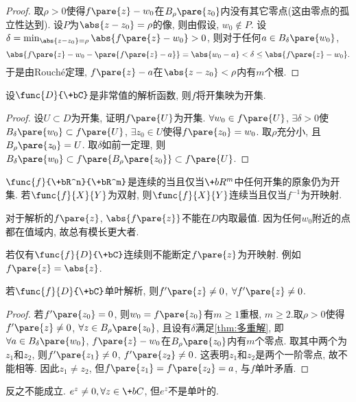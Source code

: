 \documentclass{ctexart}
\begin{document}
\begin{proof}
    取$\rho > 0$使得$f\pare{z} - w_0$在$B_\rho\pare{z_0}$内没有其它零点(这由零点的孤立性达到). 设$P$为$\abs{z-z_0} = \rho$的像, 则由假设, $w_0 \notin P$. 设$\delta = \min_{\abs{z-z_0} = \rho} \abs{f\pare{z} - w_0} > 0$, 则对于任何$a\in B_\delta\pare{w_0}$,
    \[ \abs{f\pare{z} - w_0 - \pare{f\pare{z} - a}} = \abs{w_0 - a} < \delta \le \abs{f\pare{z} - w_0}. \]
    于是由Rouch\'e定理, $f\pare{z} - a$在$\abs{z-z_0}<\rho$内有$m$个根.
\end{proof}
\begin{corollary}[开映射定理]
    设$\func{D}{\+bC}$是非常值的解析函数, 则$f$将开集映为开集.
\end{corollary}
\begin{proof}
    设$U\subset D$为开集, 证明$f\pare{U}$为开集. $\forall w_0 \in f\pare{U}$, $\exists \delta > 0$使$B_\delta\pare{w_0} \subset f\pare{U}$, $\exists z_0 \in U$使得$f\pare{z_0} = w_0$. 取$\rho$充分小, 且$B_\rho\pare{z_0} = U$. 取$\delta$如前一定理, 则$B_\delta\pare{w_0} \subset f\pare{B_\rho\pare{z_0}}\subset f\pare{U}$.
\end{proof}
\begin{remark}
    $\func{f}{\+bR^n}{\+bR^m}$是连续的当且仅当$\+bR^m$中任何开集的原象仍为开集. 若$\func{f}{X}{Y}$为双射, 则$\func{f}{X}{Y}$连续当且仅当$f^{-1}$为开映射.
\end{remark}
\begin{ex}
    对于解析的$f\pare{z}$, $\abs{f\pare{z}}$不能在$D$内取最值. 因为任何$w_0$附近的点都在值域内, 故总有模长更大者.
\end{ex}
\begin{remark}
    若仅有$\func{f}{D}{\+bC}$连续则不能断定$f\pare{z}$为开映射. 例如$f\pare{z} = \abs{z}$.
\end{remark}
\begin{corollary}
    若$\func{f}{D}{\+bC}$单叶解析, 则$f'\pare{z}\neq 0$, $\forall f'\pare{z} \neq 0$.
\end{corollary}
\begin{proof}
    若$f'\pare{z_0} = 0$, 则$w_0 = f\pare{z_0}$有$m\ge 1$重根, $m\ge 2$.取$\rho > 0$使得$f'\pare{z}\neq 0$, $\forall z\in B_\rho\pare{z_0}$, 且设有$\delta$满足\cref{thm:多重解}, 即$\forall a\in B_\delta\pare{w_0}$, $f\pare{z} - w_0$在$B_\rho\pare{z_0}$内有$m$个零点. 取其中两个为$z_1$和$z_2$, 则$f'\pare{z_1} \neq 0$, $f'\pare{z_2}\neq 0$. 这表明${z_1}$和${z_2}$是两个一阶零点, 故不能相等. 因此$z_1\neq z_2$, 但$f\pare{z_1} = f\pare{z_2} = a$, 与$f$单叶矛盾.
\end{proof}
\begin{remark}
    反之不能成立. $e^z\neq 0, \forall z\in \+bC$, 但$e^z$不是单叶的.
\end{remark}
\end{document}
